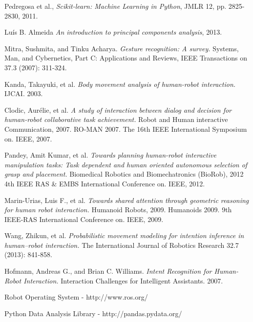 \begin{thebibliography}{1}

Pedregosa et al., \emph{Scikit-learn: Machine Learning in Python},  JMLR 12, pp. 2825-2830, 2011.

Luís B. Almeida \emph{An introduction to principal components analysis}, 2013.

Mitra, Sushmita, and Tinku Acharya. \emph{Gesture recognition: A survey.} Systems, Man, and Cybernetics, Part C: Applications and Reviews, IEEE Transactions on 37.3 (2007): 311-324.

Kanda, Takayuki, et al. \emph{Body movement analysis of human-robot interaction.} IJCAI. 2003.

Clodic, Aurélie, et al. \emph{A study of interaction between dialog and decision for human-robot collaborative task achievement.} Robot and Human interactive Communication, 2007. RO-MAN 2007. The 16th IEEE International Symposium on. IEEE, 2007.

Pandey, Amit Kumar, et al. \emph{Towards planning human-robot interactive manipulation tasks: Task dependent and human oriented autonomous selection of grasp and placement.} Biomedical Robotics and Biomechatronics (BioRob), 2012 4th IEEE RAS \& EMBS International Conference on. IEEE, 2012.

Marin-Urias, Luis F., et al. \emph{Towards shared attention through geometric reasoning for human robot interaction.} Humanoid Robots, 2009. Humanoids 2009. 9th IEEE-RAS International Conference on. IEEE, 2009.

Wang, Zhikun, et al. \emph{Probabilistic movement modeling for intention inference in human–robot interaction.} The International Journal of Robotics Research 32.7 (2013): 841-858.

Hofmann, Andreas G., and Brian C. Williams. \emph{Intent Recognition for Human-Robot Interaction.} Interaction Challenges for Intelligent Assistants. 2007.

Robot Operating System - http://www.ros.org/

Python Data Analysis Library - http://pandas.pydata.org/

\end{thebibliography}
